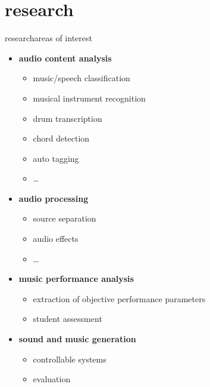         \section[research]{research}
        \begin{frame}{research}{areas of interest}
            \begin{itemize}
                \item   \textbf{audio content analysis}
                    \begin{itemize}
                        \item   music/speech classification
                        \item   musical instrument recognition
                        \item   drum transcription
                        \item   chord detection
                        \item   auto tagging
                        \item   \ldots
                    \end{itemize}
                 \bigskip
                 \item<2->  \textbf{audio processing}
                    \begin{itemize}
                        \item   source separation
                        \item   audio effects
                        \item   \ldots
                    \end{itemize}
                 \bigskip
                 \item<3->  \textbf{music performance analysis}
                    \begin{itemize}
                        \item   extraction of objective performance parameters
                        \item   student assessment
                    \end{itemize}
                 \bigskip
                 \item<3->  \textbf{sound and music generation}
                    \begin{itemize}
                        \item   controllable systems
                        \item   evaluation
                    \end{itemize}
            \end{itemize}
        \end{frame}

